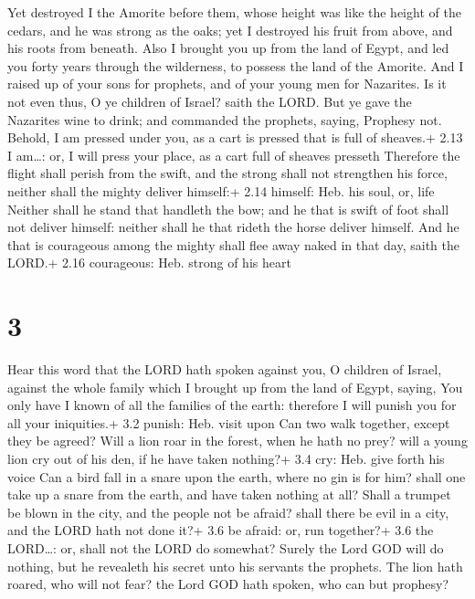  Yet destroyed I the Amorite before them, whose height was
like the height of the cedars, and he was strong as the oaks; yet I
destroyed his fruit from above, and his roots from beneath.
 Also I brought you up from the land of Egypt, and led you
forty years through the wilderness, to possess the land of the Amorite.
 And I raised up of your sons for prophets, and of your
young men for Nazarites. Is it not even thus, O ye children of Israel?
saith the LORD.  But ye gave the Nazarites wine to drink;
and commanded the prophets, saying, Prophesy not.  Behold,
I am pressed under you, as a cart is pressed that is full of sheaves.+
2.13 I am\ldots: or, I will press your place, as a cart full of sheaves
presseth  Therefore the flight shall perish from the swift,
and the strong shall not strengthen his force, neither shall the mighty
deliver himself:+ 2.14 himself: Heb. his soul, or, life 
Neither shall he stand that handleth the bow; and he that is swift of
foot shall not deliver himself: neither shall he that rideth the horse
deliver himself.  And he that is courageous among the
mighty shall flee away naked in that day, saith the LORD.+ 2.16
courageous: Heb. strong of his heart

\hypertarget{section-2}{%
\section{3}\label{section-2}}

 Hear this word that the LORD hath spoken against you, O
children of Israel, against the whole family which I brought up from the
land of Egypt, saying,  You only have I known of all the
families of the earth: therefore I will punish you for all your
iniquities.+ 3.2 punish: Heb. visit upon  Can two walk
together, except they be agreed?  Will a lion roar in the
forest, when he hath no prey? will a young lion cry out of his den, if
he have taken nothing?+ 3.4 cry: Heb. give forth his voice 
Can a bird fall in a snare upon the earth, where no gin is for him?
shall one take up a snare from the earth, and have taken nothing at all?
 Shall a trumpet be blown in the city, and the people not be
afraid? shall there be evil in a city, and the LORD hath not done it?+
3.6 be afraid: or, run together?+ 3.6 the LORD\ldots: or, shall not the
LORD do somewhat?  Surely the Lord GOD will do nothing, but
he revealeth his secret unto his servants the prophets.  The
lion hath roared, who will not fear? the Lord GOD hath spoken, who can
but prophesy?

